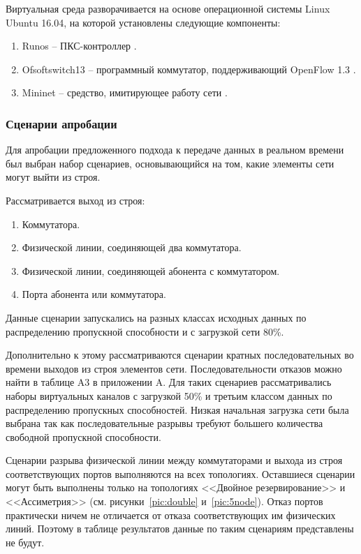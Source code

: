 \documentclass[12pt, a4paper]{article}
\begin{document}
Виртуальная среда разворачивается на основе операционной системы Linux Ubuntu 16.04,
на которой установлены следующие компоненты:
\begin{enumerate}
	\item Runos -- ПКС-контроллер \cite{runos}.
	\item Ofsoftswitch13 -- программный коммутатор, поддерживающий OpenFlow 1.3 \cite{ofsoftswitch}.
	\item Mininet -- средство, имитирующее работу сети \cite{mininet}.
\end{enumerate}

\subsubsection{Сценарии апробации}

Для апробации предложенного подхода к передаче данных в реальном времени был выбран набор сценариев, основывающийся на том, какие элементы сети могут выйти из строя. 

Рассматривается выход из строя:
\begin{enumerate}
	\item Коммутатора.
	\item Физической линии, соединяющей два коммутатора.
	\item Физической линии, соединяющей абонента с коммутатором.
	\item Порта абонента или коммутатора.
\end{enumerate}

Данные сценарии запускались на разных классах исходных данных по распределению пропускной способности и с загрузкой сети 80\%. 

Дополнительно к этому рассматриваются сценарии кратных последовательных во времени выходов из строя элементов сети. Последовательности отказов можно найти в таблице A3 в приложении A. Для таких сценариев рассматривались наборы виртуальных каналов с загрузкой 50\% и третьим классом данных по распределению пропускных способностей. Низкая начальная загрузка сети была выбрана так как последовательные разрывы требуют большего количества свободной пропускной способности.

Сценарии разрыва физической линии между коммутаторами и выхода из строя соответствующих портов выполняются на всех топологиях. Оставшиеся сценарии могут быть выполнены только на топологиях <<Двойное резервирование>> и <<Ассиметрия>> (см. рисунки~\ref{pic:double} и~\ref{pic:5node}). Отказ портов практически ничем не отличается от отказа соответствующих им физических линий. Поэтому в таблице результатов данные по таким сценариям представлены не будут.
\end{document}

